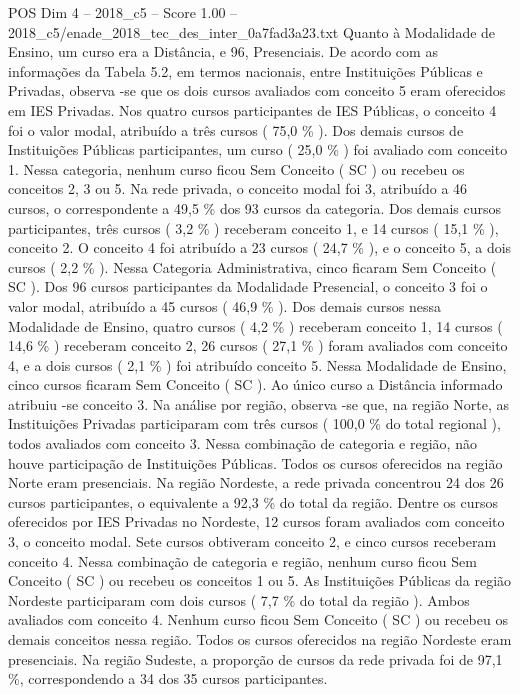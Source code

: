 \begin{textsample}{POS Dim 4 – 2018\_c5 – Score 1.00 – 2018\_c5/enade\_2018\_tec\_des\_inter\_0a7fad3a23.txt}
Quanto à Modalidade de Ensino, um curso era a Distância, e 96, Presenciais.
De acordo com as informações da Tabela 5.2, em termos nacionais, entre Instituições Públicas e Privadas, observa -se que os dois cursos avaliados com conceito 5 eram oferecidos em IES Privadas.
Nos quatro cursos participantes de IES Públicas, o conceito 4 foi o valor modal, atribuído a três cursos ( 75,0 \% ).
Dos demais cursos de Instituições Públicas participantes, um curso ( 25,0 \% ) foi avaliado com conceito 1.
Nessa categoria, nenhum curso ficou Sem Conceito ( SC ) ou recebeu os conceitos 2, 3 ou 5.
Na rede privada, o conceito modal foi 3, atribuído a 46 cursos, o correspondente a 49,5 \% dos 93 cursos da categoria.
Dos demais cursos participantes, três cursos ( 3,2 \% ) receberam conceito 1, e 14 cursos ( 15,1 \% ), conceito 2.
O conceito 4 foi atribuído a 23 cursos ( 24,7 \% ), e o conceito 5, a dois cursos ( 2,2 \% ).
Nessa Categoria Administrativa, cinco ficaram Sem Conceito ( SC ).
Dos 96 cursos participantes da Modalidade Presencial, o conceito 3 foi o valor modal, atribuído a 45 cursos ( 46,9 \% ).
Dos demais cursos nessa Modalidade de Ensino, quatro cursos ( 4,2 \% ) receberam conceito 1, 14 cursos ( 14,6 \% ) receberam conceito 2, 26 cursos ( 27,1 \% ) foram avaliados com conceito 4, e a dois cursos ( 2,1 \% ) foi atribuído conceito 5.
Nessa Modalidade de Ensino, cinco cursos ficaram Sem Conceito ( SC ).
Ao único curso a Distância informado atribuiu -se conceito 3.
Na análise por região, observa -se que, na região Norte, as Instituições Privadas participaram com três cursos ( 100,0 \% do total regional ), todos avaliados com conceito 3.
Nessa combinação de categoria e região, não houve participação de Instituições Públicas.
Todos os cursos oferecidos na região Norte eram presenciais.
Na região Nordeste, a rede privada concentrou 24 dos 26 cursos participantes, o equivalente a 92,3 \% do total da região.
Dentre os cursos oferecidos por IES Privadas no Nordeste, 12 cursos foram avaliados com conceito 3, o conceito modal.
Sete cursos obtiveram conceito 2, e cinco cursos receberam conceito 4.
Nessa combinação de categoria e região, nenhum curso ficou Sem Conceito ( SC ) ou recebeu os conceitos 1 ou 5.
As Instituições Públicas da região Nordeste participaram com dois cursos ( 7,7 \% do total da região ).
Ambos avaliados com conceito 4.
Nenhum curso ficou Sem Conceito ( SC ) ou recebeu os demais conceitos nessa região.
Todos os cursos oferecidos na região Nordeste eram presenciais.
Na região Sudeste, a proporção de cursos da rede privada foi de 97,1 \%, correspondendo a 34 dos 35 cursos participantes.

\end{textsample}
